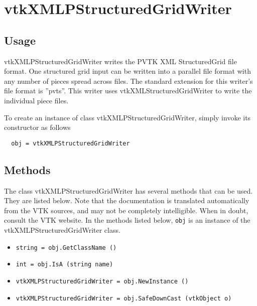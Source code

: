 \section{vtkXMLPStructuredGridWriter}

\subsection{Usage}

 vtkXMLPStructuredGridWriter writes the PVTK XML StructuredGrid
 file format.  One structured grid input can be written into a
 parallel file format with any number of pieces spread across files.
 The standard extension for this writer's file format is ''pvts''.
 This writer uses vtkXMLStructuredGridWriter to write the individual
 piece files.

To create an instance of class vtkXMLPStructuredGridWriter, simply
invoke its constructor as follows
\begin{verbatim}
  obj = vtkXMLPStructuredGridWriter
\end{verbatim}
\subsection{Methods}

The class vtkXMLPStructuredGridWriter has several methods that can be used.
  They are listed below.
Note that the documentation is translated automatically from the VTK sources,
and may not be completely intelligible.  When in doubt, consult the VTK website.
In the methods listed below, \verb|obj| is an instance of the vtkXMLPStructuredGridWriter class.
\begin{itemize}
\item  \verb|string = obj.GetClassName ()|

\item  \verb|int = obj.IsA (string name)|

\item  \verb|vtkXMLPStructuredGridWriter = obj.NewInstance ()|

\item  \verb|vtkXMLPStructuredGridWriter = obj.SafeDownCast (vtkObject o)|

\end{itemize}
